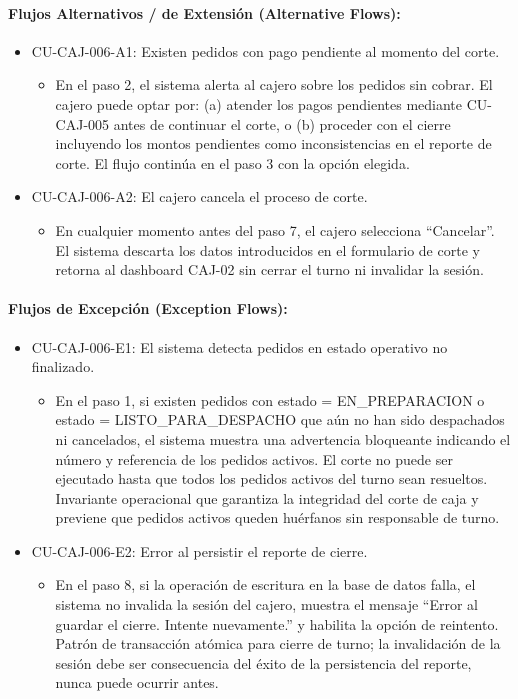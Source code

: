 \paragraph{Flujos Alternativos / de Extensión (Alternative Flows):}
\begin{itemize}
    \item CU-CAJ-006-A1: Existen pedidos con pago pendiente al momento del corte.
    \begin{itemize}
        \item En el paso 2, el sistema alerta al cajero sobre los pedidos sin cobrar. El cajero puede optar por: (a) atender los pagos pendientes mediante CU-CAJ-005 antes de continuar el corte, o (b) proceder con el cierre incluyendo los montos pendientes como inconsistencias en el reporte de corte. El flujo continúa en el paso 3 con la opción elegida.
    \end{itemize}
    \item CU-CAJ-006-A2: El cajero cancela el proceso de corte.
    \begin{itemize}
        \item En cualquier momento antes del paso 7, el cajero selecciona ``Cancelar''. El sistema descarta los datos introducidos en el formulario de corte y retorna al dashboard CAJ-02 sin cerrar el turno ni invalidar la sesión.
    \end{itemize}
\end{itemize}

\paragraph{Flujos de Excepción (Exception Flows):}
\begin{itemize}
    \item CU-CAJ-006-E1: El sistema detecta pedidos en estado operativo no finalizado.
    \begin{itemize}
        \item En el paso 1, si existen pedidos con estado = EN\_PREPARACION o estado = LISTO\_PARA\_DESPACHO que aún no han sido despachados ni cancelados, el sistema muestra una advertencia bloqueante indicando el número y referencia de los pedidos activos. El corte no puede ser ejecutado hasta que todos los pedidos activos del turno sean resueltos. Invariante operacional que garantiza la integridad del corte de caja y previene que pedidos activos queden huérfanos sin responsable de turno.
    \end{itemize}
    \item CU-CAJ-006-E2: Error al persistir el reporte de cierre.
    \begin{itemize}
        \item En el paso 8, si la operación de escritura en la base de datos falla, el sistema no invalida la sesión del cajero, muestra el mensaje ``Error al guardar el cierre. Intente nuevamente.'' y habilita la opción de reintento. Patrón de transacción atómica para cierre de turno; la invalidación de la sesión debe ser consecuencia del éxito de la persistencia del reporte, nunca puede ocurrir antes.
    \end{itemize}
\end{itemize}

